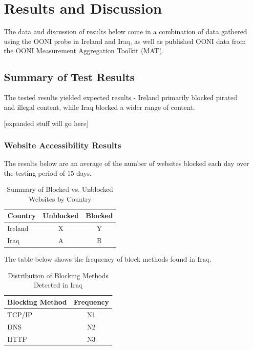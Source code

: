 \chapter{Results and Discussion}

The data and discussion of results below come in a combination of data gathered using the OONI probe in Ireland and Iraq, as well as published OONI data from the OONI Measurement Aggregation Toolkit (MAT).

\section{Summary of Test Results}

The tested results yielded expected results - Ireland primarily blocked pirated and illegal content, while Iraq blocked a wider range of content.

[expanded stuff will go here]

\subsection{Website Accessibility Results}

The results below are an average of the number of websites blocked each day over the testing period of 15 days.

\begin{table}[H]
\centering
\caption{Summary of Blocked vs. Unblocked Websites by Country}
\begin{tabular}{lcc}
\toprule
\textbf{Country} & \textbf{Unblocked} & \textbf{Blocked} \\
\midrule
Ireland & X & Y \\
Iraq    & A & B \\
\bottomrule
\end{tabular}
\label{tab:blocked_summary}
\end{table}

The table below shows the frequency of block methods found in Iraq.

\begin{table}[H]
\centering
\caption{Distribution of Blocking Methods Detected in Iraq}
\begin{tabular}{lc}
\toprule
\textbf{Blocking Method} & \textbf{Frequency} \\
\midrule
TCP/IP          & N1 \\
DNS & N2 \\
HTTP & N3 \\
\bottomrule
\end{tabular}
\label{tab:iraq_blocking_methods}
\end{table}

